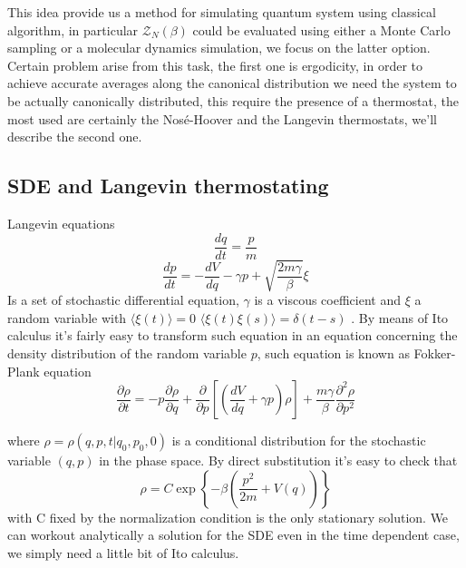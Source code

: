 \documentclass[10pt,a4paper]{article}
\begin{document}
This idea provide us a method for simulating quantum system using classical algorithm, in particular $\mathcal{Z}_N(\beta)$ could be evaluated using either a Monte Carlo sampling or a molecular dynamics simulation, we focus on the latter option.
Certain problem arise from this task, the first one is ergodicity, in order to achieve accurate averages along the canonical distribution we need the system to be actually canonically distributed, this require the presence of a thermostat, the most used are certainly the Nosé-Hoover and the Langevin thermostats, we'll describe the second one.

\subsection{SDE and Langevin thermostating}
Langevin equations
\[\frac{dq}{dt}=\frac{p}{m} \]
\[\frac{dp}{dt}=-\frac{dV}{dq}-\gamma p+\sqrt{\frac{2m\gamma}{\beta}} \xi \]
Is a set of stochastic differential equation, $\gamma$ is a viscous coefficient and $\xi$ a random variable with $\langle\xi(t)\rangle=0$ $\langle\xi(t)\xi(s)\rangle = \delta(t-s)$ .
By means of Ito calculus it's fairly easy to transform such equation in an equation concerning the density distribution of the random variable $p$, such equation is known as Fokker-Plank equation
\[ \frac{\partial\rho}{\partial t} = -p\frac{\partial\rho}{\partial q}+\frac{\partial}{\partial p}[(\frac{dV}{dq}+\gamma p)\rho]+\frac{m\gamma}{\beta}\frac{\partial^2\rho}{\partial p^2} \]

where $\rho= \rho(q,p,t|q_0,p_0,0)$ is a conditional distribution for the stochastic variable $(q,p)$ in the phase space.
By direct substitution it's easy to check that
\[\rho = C \exp	\left\{ -\beta(\frac{p^2}{2m}+V(q)) \right\}  \]
with C fixed by the normalization condition is the only stationary solution.
We can workout analytically a solution for the SDE even in the time dependent case, we simply need a little bit of Ito calculus. 
\end{document}
